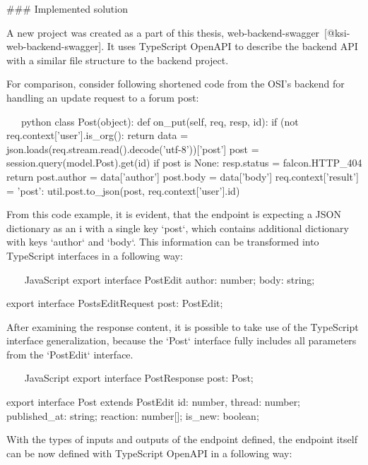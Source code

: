 \documentclass[
  digital, %
  oneside, %
  lof,     %
  lot,     %
]{fithesis4}
\begin{document}
### Implemented solution

A new project was created as a part of this thesis, web-backend-swagger~[@ksi-web-backend-swagger]. It uses TypeScript OpenAPI to describe the backend API with a similar file structure to the backend project. 

For comparison, consider following shortened code from the OSI's backend for handling an update request to a forum post:

\newpage
~~~python
class Post(object):
    def on_put(self, req, resp, id):
        if (not req.context['user'].is_org():
            return
        data = json.loads(req.stream.read().decode('utf-8'))['post']
        post = session.query(model.Post).get(id)
        if post is None:
            resp.status = falcon.HTTP_404
            return
        post.author = data['author']
        post.body = data['body']
        req.context['result'] = {'post': util.post.to_json(post, req.context['user'].id)}
~~~


From this code example, it is evident, that the endpoint is expecting a JSON dictionary as an i with a single key `post`, which contains additional dictionary with keys `author` and `body`. This information can be transformed into TypeScript interfaces in a following way:


~~~ JavaScript
export interface PostEdit {
    author: number;
    body: string;
}

export interface PostsEditRequest {
    post: PostEdit;
}
~~~

After examining the response content, it is possible to take use of the TypeScript interface generalization, because the `Post` interface fully includes all parameters from the `PostEdit` interface.

~~~ JavaScript
export interface PostResponse {
    post: Post;
}

export interface Post extends PostEdit {
    id: number,
    thread: number;
    published_at: string;
    reaction: number[];
    is_new: boolean;
}
~~~

With the types of inputs and outputs of the endpoint defined, the endpoint itself can be now defined with TypeScript OpenAPI in a following way:
\end{document}
